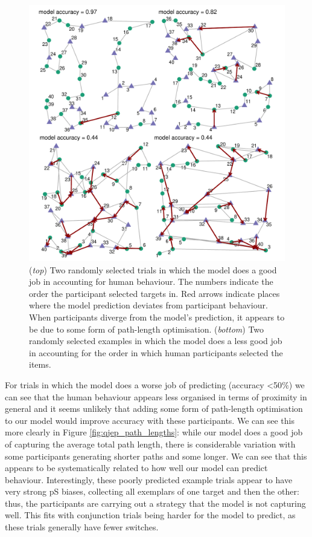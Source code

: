 \documentclass[preprints, article,submit,pdftex,moreauthors]{Definitions/mdpi}
\begin{document}
\begin{figure}[H]
\centering
\includegraphics[width=12 cm]{Figures/qjep_ex_paths.pdf}
\caption{(\textit{top}) Two randomly selected trials in which the model does a good job in accounting for human behaviour. The numbers indicate the order the participant selected targets in. Red arrows indicate places where the model prediction deviates from participant behaviour. When participants diverge from the model's prediction, it appears to be due to some form of path-length optimisation. (\textit{bottom}) Two randomly selected examples in which the model does a less good job in accounting for the order in which human participants selected the items.}
\label{fig:qjep_paths}
\end{figure} 

For trials in which the model does a worse job of predicting (accuracy <50$\%$) we can see that the human behaviour appears less organised in terms of proximity in general and it seems unlikely that adding some form of path-length optimisation to our model would improve accuracy with these participants. We can see this more clearly in Figure \ref{fig:qjep_path_lengths}: while our model does a good job of capturing the average total path length, there is considerable variation with some participants generating shorter paths and some longer. We can see  that this appears to be systematically related to how well our model can predict behaviour. Interestingly, these poorly predicted example trials appear to have very strong pS biases, collecting all exemplars of one target and then the other: thus, the participants are carrying out a strategy that the model is not capturing well. This fits with conjunction trials being harder for the model to predict, as these trials generally have fewer switches. 
\end{document}

